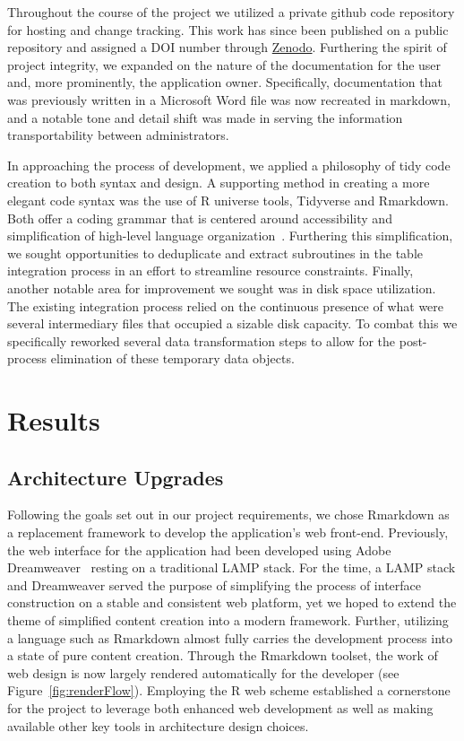 \documentclass[10pt]{report}
\begin{document}
Throughout the course of the project we utilized a private github code repository for hosting and change tracking. This work has since been published on a public repository and assigned a DOI number through \href{https://zenodo.org/record/4422027}{Zenodo}. Furthering the spirit of project integrity, we expanded on the nature of the documentation for the user and, more prominently, the application owner. Specifically, documentation that was previously written in a Microsoft Word file was now recreated in markdown, and a notable tone and detail shift was made in serving the information transportability between administrators.

In approaching the process of development, we applied a philosophy of tidy code creation to both syntax and design. A supporting method in creating a more elegant code syntax was the use of R universe tools, Tidyverse and Rmarkdown. Both offer a coding grammar that is centered around accessibility and simplification of high-level language organization~\cite{wickhamWelcomeTidyverse2019}. Furthering this simplification, we sought opportunities to deduplicate and extract subroutines in the table integration process in an effort to streamline resource constraints. Finally, another notable area for improvement we sought was in disk space utilization. The existing integration process relied on the continuous presence of what were several intermediary files that occupied a sizable disk capacity. To combat this we specifically reworked several data transformation steps to allow for the post-process elimination of these temporary data objects.

\section{Results}

\subsection{Architecture Upgrades}
Following the goals set out in our project requirements, we chose Rmarkdown as a replacement framework to develop the application's web front-end. Previously, the web interface for the application had been developed using Adobe Dreamweaver~\cite{abbottCandidateCancerGene2015a} resting on a traditional LAMP stack. For the time, a LAMP stack and Dreamweaver served the purpose of simplifying the process of interface construction on a stable and consistent web platform, yet we hoped to extend the theme of simplified content creation into a modern framework. Further, utilizing a language such as Rmarkdown almost fully carries the development process into a state of pure content creation. Through the Rmarkdown toolset, the work of web design is now largely rendered automatically for the developer (see Figure~\ref{fig:renderFlow}). Employing the R web scheme established a cornerstone for the project to leverage both enhanced web development as well as making available other key tools in architecture design choices.
\end{document}
